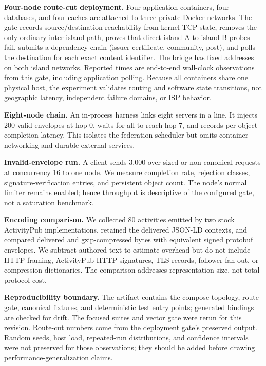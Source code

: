 \documentclass[sigconf,anonymous]{acmart}
\begin{document}
\textbf{Four-node route-cut deployment.} Four application containers, four databases, and four
caches are attached to three private Docker networks. The gate records source/destination reachability
from kernel TCP state, removes the only ordinary inter-island path, proves that direct island-A to
island-B probes fail, submits a dependency chain (issuer certificate, community, post), and polls the
destination for each exact content identifier. The bridge has fixed addresses on both island
networks. Reported times are end-to-end wall-clock observations from this gate, including application
polling. Because all containers share one physical host, the experiment validates routing and
software state transitions, not geographic latency, independent failure domains, or ISP behavior.

\textbf{Eight-node chain.} An in-process harness links eight servers in a line. It injects 200 valid
envelopes at hop 0, waits for all to reach hop 7, and records per-object completion latency. This
isolates the federation scheduler but omits container networking and durable external services.

\textbf{Invalid-envelope run.} A client sends 3,000 over-sized or non-canonical requests at
concurrency 16 to one node. We measure completion rate, rejection classes, signature-verification
entries, and persistent object count. The node's normal limiter remains enabled; hence throughput is
descriptive of the configured gate, not a saturation benchmark.

\textbf{Encoding comparison.} We collected 80 activities emitted by two stock ActivityPub
implementations, retained the delivered JSON-LD contexts, and compared delivered and gzip-compressed
bytes with equivalent signed protobuf envelopes. We subtract authored text to estimate overhead but
do not include HTTP framing, ActivityPub HTTP signatures, TLS records, follower fan-out, or
compression dictionaries. The comparison addresses representation size, not total protocol cost.

\textbf{Reproducibility boundary.} The artifact contains the compose topology, route gate, canonical
fixtures, and deterministic test entry points; generated bindings are checked for drift. The focused
suites and vector gate were rerun for this revision. Route-cut numbers come from the deployment
gate's preserved output. Random seeds, host load, repeated-run distributions, and confidence
intervals were not preserved for those observations; they should be added before drawing
performance-generalization claims.
\end{document}
